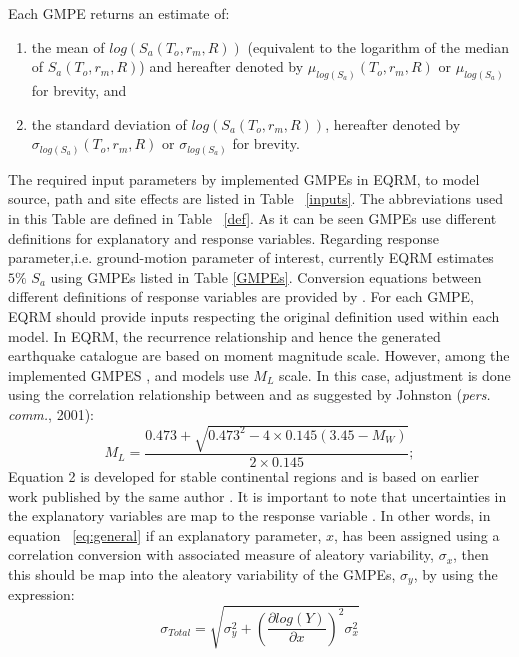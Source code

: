 Each GMPE returns an estimate of:
\begin{enumerate}
\item the mean of $log(S_a(T_o,r_m,R))$ (equivalent to the
logarithm of the median of $S_a(T_o,r_m,R)$) and hereafter denoted
by $\mu_{log(S_a)}(T_o,r_m,R)$ or $\mu_{log(S_a)}$ for brevity, and
\item the standard deviation of $log(S_a(T_o,r_m,R))$, hereafter
denoted by \newline $\sigma_{log(S_a)}(T_o,r_m,R)$ or
$\sigma_{log(S_a)}$ for brevity.
\end{enumerate}


The required input parameters by implemented GMPEs in EQRM, to model
source, path and site effects are listed in Table ~\ref{inputs}. The
abbreviations used in this Table are defined in Table ~\ref{def}. As
it can be seen GMPEs use different definitions for explanatory and
response variables. Regarding response parameter,i.e. ground-motion
parameter of interest, currently EQRM estimates $5 \%$ $S_a$ using
GMPEs listed in Table \ref{GMPEs}. Conversion equations between
different definitions of response variables are provided by
\citet{eqrm_Beyer06}.  For each GMPE, EQRM should provide inputs
respecting the original definition used within each model. In EQRM,
the recurrence relationship and hence the generated earthquake
catalogue are based on moment magnitude scale. However, among the
implemented GMPES \citet{eqrm_Gaull90a}, and \citet{eqrm_Liang08}
models use $M_L$ scale. In this case, adjustment is done using the
correlation relationship between and as suggested by Johnston
(\textit{pers. comm.}, 2001):
\begin{equation}
M_L =
\frac{0.473+\sqrt{0.473^2-4\times0.145(3.45-M_W)}}{2\times0.145};
\end{equation}
Equation 2 is developed for stable continental regions and is based
on earlier work published by the same author
\citep{eqrm_Johnstone96a}. It is important to note that
uncertainties in the explanatory variables are map to the response
variable \citep{eqrm_Bommer05}. In other words, in equation
~\ref{eq:general} if an explanatory parameter, $x$, has been
assigned using a correlation conversion with associated measure of
aleatory variability, $\sigma_x$, then this should be map into the
aleatory variability of the GMPEs, $\sigma_y$, by using the
expression:
\begin{equation}
\sigma_{Total} = \sqrt{\sigma_y^2+(\dfrac{\partial log(Y)}{\partial
x})^2 \sigma_x^2}
\end{equation}

